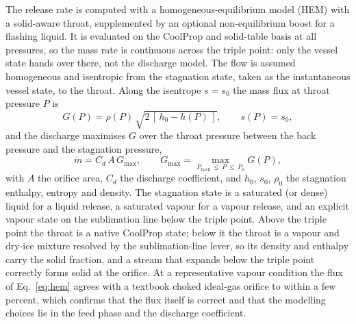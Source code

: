 \documentclass[5p,authoryear]{elsarticle}
\begin{document}
The release rate is computed with a homogeneous-equilibrium model (HEM) with a solid-aware throat,
supplemented by an optional non-equilibrium boost for a flashing liquid. It is evaluated on the
CoolProp and solid-table basis at all pressures, so the mass rate is continuous across the triple
point: only the vessel state hands over there, not the discharge model. The flow is assumed
homogeneous and isentropic from the stagnation state, taken as the instantaneous vessel state, to
the throat. Along the isentrope $s = s_0$
the mass flux at throat pressure $P$ is
\begin{equation}
\label{eq:hem}
G(P) = \rho(P)\,\sqrt{2\,[\,h_0 - h(P)\,]}, \qquad s(P) = s_0,
\end{equation}
and the discharge maximises $G$ over the throat pressure between the back pressure and the
stagnation pressure,
\begin{equation}
\label{eq:mdot}
\dot m = C_d\,A\,G_\text{max}, \qquad G_\text{max} = \max_{P_\text{back}\,\le\, P\,\le\, P_0} G(P),
\end{equation}
with $A$ the orifice area, $C_d$ the discharge coefficient, and $h_0$, $s_0$, $\rho_0$ the
stagnation enthalpy, entropy and density. The stagnation state is a saturated (or dense) liquid for
a liquid release, a saturated vapour for a vapour release, and an explicit vapour state on the
sublimation line below the triple point. Above the triple point the throat is a native CoolProp
state; below it the throat is a vapour and dry-ice mixture resolved by the sublimation-line lever,
so its density and enthalpy carry the solid fraction, and a stream that expands below the triple
point correctly forms solid at the orifice. At a representative vapour condition the flux of
Eq.~\eqref{eq:hem} agrees with a textbook choked ideal-gas orifice to within a few percent, which
confirms that the flux itself is correct and that the modelling choices lie in the feed phase and
the discharge coefficient.
\end{document}
